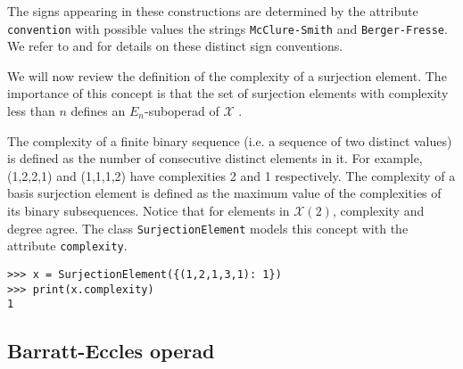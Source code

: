 \documentclass{amsart}
\begin{document}
The signs appearing in these constructions are determined by the attribute \texttt{convention} with possible values the strings \texttt{McClure-Smith} and \texttt{Berger-Fresse}. We refer to \cite{McClureSmith03} and \cite{BergerFresse04} for details on these distinct sign conventions.

We will now review the definition of the complexity of a surjection element. The importance of this concept is that the set of surjection elements with complexity less than $n$ defines an $E_n$-suboperad of $\mathcal X$ \cite{McClureSmith03}.

The complexity of a finite binary sequence (i.e. a sequence of two distinct values) is defined as the number of consecutive distinct elements in it. For example, (1,2,2,1) and (1,1,1,2) have complexities 2 and 1 respectively. The complexity of a basis surjection element is defined as the maximum value of the complexities of its binary subsequences. Notice that for elements in $\mathcal X(2)$, complexity and degree agree. The class \texttt{SurjectionElement} models this concept with the attribute \texttt{complexity}.

\begin{Verbatim}[frame=single]
>>> x = SurjectionElement({(1,2,1,3,1): 1})
>>> print(x.complexity)
1
\end{Verbatim}

\subsection{Barratt-Eccles operad}
\end{document}
